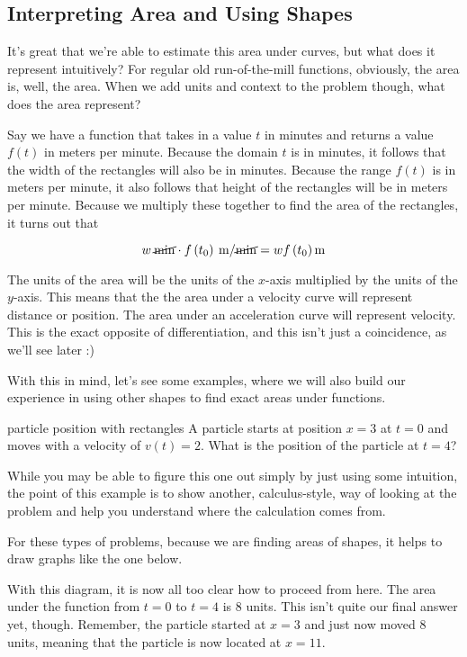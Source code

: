 \subsection{Interpreting Area and Using Shapes}

It's great that we're able to estimate this area under curves, but what does it represent intuitively? For regular old run-of-the-mill functions, obviously, the area is, well, the area. When we add units and context to the problem though, what does the area represent?

Say we have a function that takes in a value \( t \) in minutes and returns a value \( f \left( t \right) \) in meters per minute. Because the domain \( t \) is in minutes, it follows that the width of the rectangles will also be in minutes. Because the range \( f \left( t \right) \) is in meters per minute, it also follows that height of the rectangles will be in meters per minute. Because we multiply these together to find the area of the rectangles, it turns out that

\[
    w \> \cancel{\si{\minute}} \cdot f \left( t_0 \right) \> \si{\meter}/\cancel{\si{\minute}} = w f \left( t_0 \right) \si{\meter}
\]

The units of the area will be the units of the \( x \)-axis multiplied by the units of the \( y \)-axis. This means that the the area under a velocity curve will represent distance or position. The area under an acceleration curve will represent velocity. This is the exact opposite of differentiation, and this isn't just a coincidence, as we'll see later :)

With this in mind, let's see some examples, where we will also build our experience in using other shapes to find exact areas under functions.

\begin{example}{particle position with rectangles}
    A particle starts at position \( x = 3 \) at \( t = 0 \) and moves with a velocity of \( v \left( t \right) = 2 \). What is the position of the particle at \( t = 4 \)?

    \vspace{0.3cm}

    While you may be able to figure this one out simply by just using some intuition, the point of this example is to show another, calculus-style, way of looking at the problem and help you understand where the calculation comes from.

    For these types of problems, because we are finding areas of shapes, it helps to draw graphs like the one below.

    \begin{figure}[H]
        \centering
        
    \end{figure}

    With this diagram, it is now all too clear how to proceed from here. The area under the function from \( t = 0 \) to \( t = 4 \) is \( 8 \) units. This isn't quite our final answer yet, though. Remember, the particle started at \( x = 3 \) and just now moved \( 8 \) units, meaning that the particle is now located at \( x = 11 \).
\end{example}

